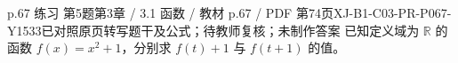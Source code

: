 \par\noindent\begin{minipage}{\linewidth}
\begin{bankitem}{p.67 练习 第5题}{第3章 / 3.1 函数 / 教材 p.67 / PDF 第74页}{XJ-B1-C03-PR-P067-Y1533}{已对照原页转写题干及公式；待教师复核；未制作答案}
已知定义域为 $\mathbb R$ 的函数 $f(x)=x^2+1$，分别求 $f(t)+1$ 与 $f(t+1)$ 的值。
\end{bankitem}
\end{minipage}\par\medskip
